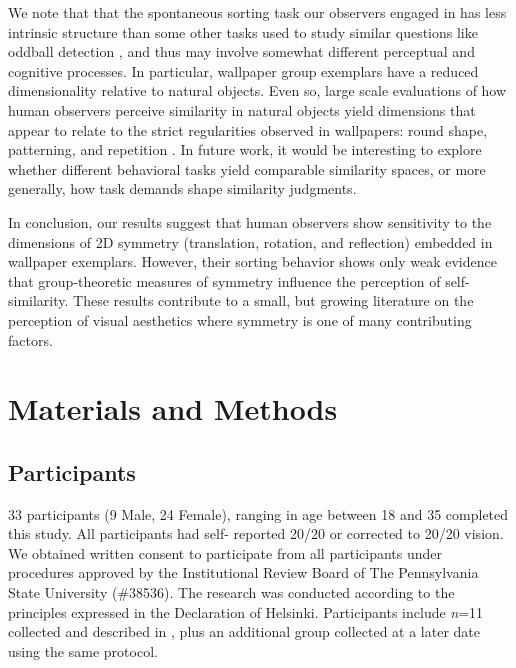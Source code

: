 \documentclass[11pt, twoside]{article}
\begin{document}
We note that that the spontaneous sorting task our observers engaged in has less intrinsic structure than some other tasks used to study similar questions like oddball detection \citep{RN1253,Hebart2020-so,Landwehr2011-kg}, and thus may involve somewhat different perceptual and cognitive processes. In particular, wallpaper group exemplars have a reduced dimensionality relative to natural objects. Even so, large scale evaluations of how human observers perceive similarity in natural objects yield dimensions that appear to relate to the strict regularities observed in wallpapers: round shape, patterning, and repetition \citep{Hebart2020-so}. In future work, it would be interesting to explore whether different behavioral tasks yield comparable similarity spaces, or more generally, how task demands shape similarity judgments.

In conclusion, our results suggest that human observers show sensitivity to the dimensions of 2D symmetry (translation, rotation, and reflection) embedded in wallpaper exemplars. However, their sorting behavior shows only weak evidence that group-theoretic measures of symmetry influence the perception of self-similarity. These results contribute to a small, but growing literature on the perception of visual aesthetics \citep{Carneiro2012-ph,Graham2010-yf,Friedenberg2012-gf,Laine-Hernandez2008-sg,Richards1972-gl} where symmetry is one of many contributing factors.

\section*{Materials and Methods}
\label{methods}

\subsection*{Participants}
33 participants (9 Male, 24 Female), ranging in age between 18 and 35 completed this study. All participants had self- reported 20/20 or corrected to 20/20 vision. We obtained written consent to participate from all participants under procedures approved by the Institutional Review Board of The Pennsylvania State University (\#38536). The research was conducted according to the principles expressed in the Declaration of Helsinki. Participants include \textit{n}=11 collected and described in \citep{vedak_thesis}, plus an additional group collected at a later date using the same protocol.
\end{document}
